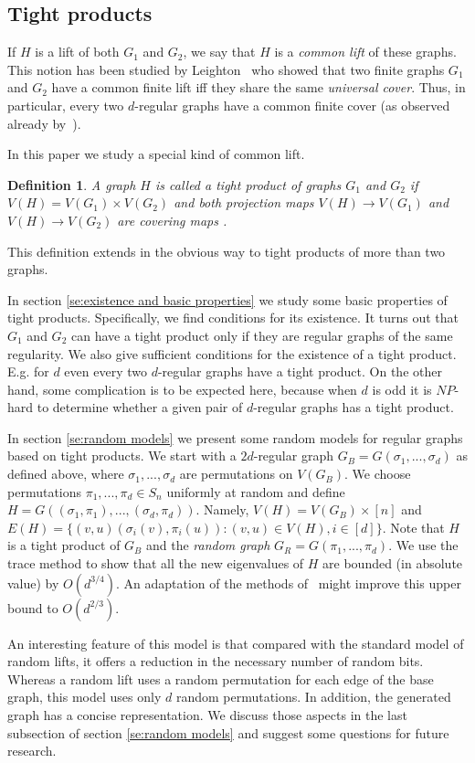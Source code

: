 \documentclass[12pt]{article}
\newtheorem{open question}[theorem]{Open question}
\newtheorem{definition}[theorem]{Definition}
\begin{document}
\subsection{Tight products}
If $H$ is a lift of both $G_1$ and $G_2$, we say that $H$ is a {\em common lift} of these graphs.
This notion has been studied by Leighton~\cite{Lei82} who showed
that two finite graphs $G_1$ and $G_2$ have a common finite lift iff they share the same {\em universal cover}.
Thus, in particular, every two $d$-regular graphs have a common finite cover (as observed already by~\cite{AG81}).

In this paper we study a special kind of common lift.
\begin{definition}
A graph $H$ is called a {\em tight product} of graphs $G_1$ and $G_2$ if $V(H)=V(G_1)\times V(G_2)$ and 
both projection maps $V(H)\rightarrow V(G_1)$ and $V(H)\rightarrow V(G_2)$ are covering maps .
\end{definition}
This definition extends in the obvious way to tight products of more than two graphs.

In section \ref{se:existence and basic properties} we study some basic properties of tight products.
Specifically, we find conditions for its existence.
It turns out that $G_1$ and $G_2$ can have a tight product only if they are regular graphs 
of the same regularity. We also give sufficient conditions for the existence of a tight product.
E.g. for $d$ even every two $d$-regular graphs have a tight product.
On the other hand, some complication is to be expected here, because when $d$ is odd
it is $NP$-hard to determine whether a given pair of $d$-regular graphs has a tight product.

In section \ref{se:random models} we present some random models for regular graphs based on tight products.
We start with a $2d$-regular graph $G_B=G(\sigma_1,...,\sigma_d)$ as defined above,
where $\sigma_1,...,\sigma_d$ are permutations on $V(G_B)$.
We choose permutations $\pi_1,...,\pi_d \in S_n$ uniformly at random and define $H=G((\sigma_1,\pi_1),...,(\sigma_d,\pi_d))$.
Namely, $V(H)=V(G_B)\times[n]$ and $E(H)=\{(v,u)(\sigma_i(v),\pi_i(u)) :(v,u)\in V(H),i \in [d]\}$. 
Note that $H$ is a tight product of $G_B$ and the {\em random graph} $G_R=G(\pi_1,...,\pi_d)$. 
We use the trace method to show that all the new eigenvalues of $H$ are bounded (in absolute value) by $O(d^{3/4})$.
An adaptation of the methods of~\cite{LP09} might improve this upper bound to $O(d^{2/3})$.

An interesting feature of this model is that compared with the standard model of random lifts,
it offers a reduction in the necessary number of random bits. Whereas a random lift uses a
random permutation for each edge of the base graph, this model uses only $d$ random permutations. 
In addition, the generated graph has a concise representation. We discuss those aspects in the last 
subsection of section \ref{se:random models} and suggest some questions for future research.
\end{document}

